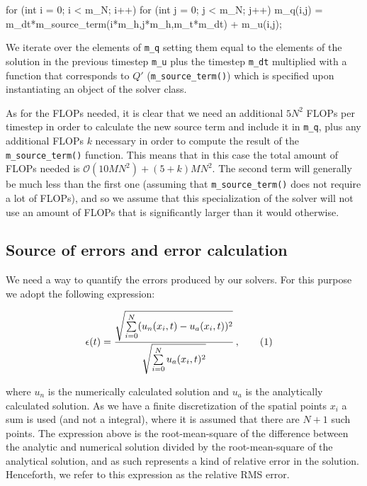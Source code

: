 \documentclass[reprint,english,notitlepage]{revtex4-1}  %
\newcommand\numberthis{\addtocounter{equation}{1}\tag{\theequation}}
\begin{document}
\begin{cpp}
for (int i = 0; i < m_N; i++){
  for (int j = 0; j < m_N; j++){
    m_q(i,j) = m_dt*m_source_term(i*m_h,j*m_h,m_t*m_dt) + m_u(i,j);
  }
}
\end{cpp}

We iterate over the elements of \verb+m_q+ setting them equal to the elements of the solution in the previous timestep \verb+m_u+ plus the timestep \verb+m_dt+ multiplied with a function that corresponds to $Q'$ (\verb+m_source_term()+) which is specified upon instantiating an object of the solver class.

As for the FLOPs needed, it is clear that we need an additional $5N^2$ FLOPs per timestep in order to calculate the new source term and include it in \verb+m_q+, plus any additional FLOPs $k$ necessary in order to compute the result of the \verb+m_source_term()+ function. This means that in this case the total amount of FLOPs needed is $\mathcal{O}(10MN^2) + (5+k)MN^2$. The second term will generally be much less than the first one (assuming that \verb+m_source_term()+ does not require a lot of FLOPs), and so we assume that this specialization of the solver will not use an amount of FLOPs that is significantly larger than it would otherwise.


\subsection{Source of errors and error calculation} \label{sec:method_errors}

We need a way to quantify the errors produced by our solvers. For this purpose we adopt the following expression:

\begin{align*}
\epsilon (t) &= \frac{\sqrt{\sum\limits_{i=0}^N (u_n(x_i,t) - u_a(x_i,t))^2}}{\sqrt{\sum\limits_{i=0}^N u_a(x_i,t)^2}} \, , \numberthis \label{eq:error_1D}
\end{align*}

where $u_n$ is the numerically calculated solution and $u_a$ is the analytically calculated solution. As we have a finite discretization of the spatial points $x_i$ a sum is used (and not a integral), where it is assumed that there are $N+1$ such points. The expression above is the root-mean-square of the difference between the analytic and numerical solution divided by the root-mean-square of the analytical solution, and as such represents a kind of relative error in the solution. Henceforth, we refer to this expression as the relative RMS error.
\end{document}
